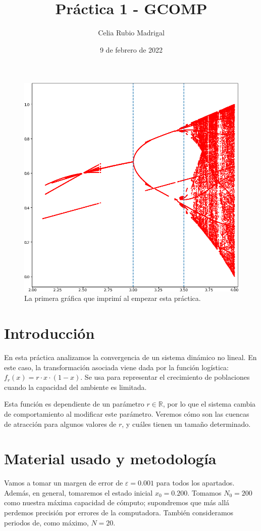 \documentclass[a4paper]{article}
\author{Celia Rubio Madrigal}
\title{Práctica 1 - GCOMP}
\date{9 de febrero de 2022}
\begin{document}
	\maketitle
	
	\tableofcontents
	
	\vfill
	
	\begin{figure}[h!]\centering
		\includegraphics[width=0.5\linewidth]{fracaso}\\[5pt]
		{La primera gráfica que imprimí al empezar esta práctica.}
	\end{figure}
	
	\newpage
	
	\section{Introducción}
	En esta práctica analizamos la convergencia de un sistema dinámico no lineal. En este caso, la transformación asociada viene dada por la función logística: $f_r(x) = r\cdot x\cdot(1-x)$.
	Se usa para representar el crecimiento de poblaciones cuando la capacidad del ambiente es limitada.
	
	Esta función es dependiente de un parámetro $r\in\mathbb{R}$, por lo que el sistema cambia de comportamiento al modificar este parámetro. Veremos cómo son las cuencas de atracción para algunos valores de $r$, y cuáles tienen un tamaño determinado.
	
	\section{Material usado y metodología}
	Vamos a tomar un margen de error de $\varepsilon=0.001$ para todos los apartados. Además, en general, tomaremos el estado inicial $x_0=0.200$. 
	Tomamos $N_0=200$ como nuestra máxima capacidad de cómputo; supondremos que más allá perdemos precisión por errores de la computadora. También consideramos periodos de, como máximo, $N=20$.
	
\end{document}
